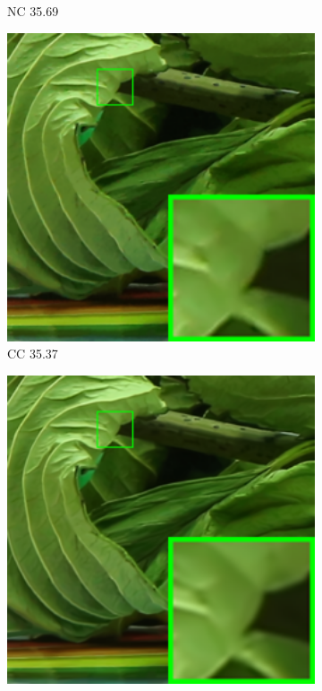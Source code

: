 \begin{figure}
\begin{subfigure}[t]{0.19\textwidth}
		\caption{NC 35.69}
    \end{subfigure}
    \hfill
    \begin{subfigure}[t]{0.19\textwidth}
        \centering
        \includegraphics[width=1\textwidth]{images/guided/cc15/resize_br_CCNoise_5dmark3_iso3200_2.png}
\caption{CC 35.37}
    \end{subfigure}
    \hfill
    \begin{subfigure}[t]{0.19\textwidth}
        \centering
        \includegraphics[width=1\textwidth]{images/guided/cc15/resize_br_Guided_5dmark3_iso3200_2_real.png}

\end{subfigure}
\end{figure}
